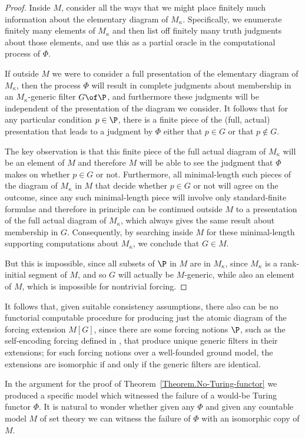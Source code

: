 \documentclass{amsart}
\begin{document}
\begin{proof}
Inside $M$, consider all the ways that we might place finitely much information about the elementary diagram of $M_\kappa$. Specifically, we enumerate finitely many elements of $M_\kappa$ and then list off finitely many truth judgments about those elements, and use this as a partial oracle in the computational process of $\Phi$.

If outside $M$ we were to consider a full presentation of the elementary diagram of $M_\kappa$, then the process $\Phi$ will result in complete judgments about membership in an $M_\kappa$-generic filter $G\of\P$, and furthermore these judgments will be independent of the presentation of the diagram we consider. It follows that for any particular condition $p\in\P$, there is a finite piece of the (full, actual) presentation that leads to a judgment by $\Phi$ either that $p\in G$ or that $p\notin G$.

The key observation is that this finite piece of the full actual diagram of $M_\kappa$ will be an element of $M$ and therefore $M$ will be able to see the judgment that $\Phi$ makes on whether $p\in G$ or not. Furthermore, all minimal-length such pieces of the diagram of $M_\kappa$ in $M$ that decide whether $p\in G$ or not will agree on the outcome, since any such minimal-length piece will involve only standard-finite formulae and therefore in principle can be continued outside $M$ to a presentation of the full actual diagram of $M_\kappa$, which always gives the same result about membership in $G$. Consequently, by searching inside $M$ for these minimal-length supporting computations about $M_\kappa$, we conclude that $G\in M$.

But this is impossible, since all subsets of $\P$ in $M$ are in $M_\kappa$, since $M_\kappa$ is a rank-initial segment of $M$, and so $G$ will actually be $M$-generic, while also an element of $M$, which is impossible for nontrivial forcing.
\end{proof}

It follows that, given suitable consistency assumptions, there also can be no functorial computable procedure for producing just the atomic diagram of the forcing extension $M[G]$, since there are some forcing notions $\P$, such as the self-encoding forcing defined in \cite{FuchsHamkinsReitz2015:Set-theoreticGeology}, that produce unique generic filters in their extensions; for such forcing notions over a well-founded ground model, the extensions are isomorphic if and only if the generic filters are identical.


In the argument for the proof of Theorem~\ref{Theorem.No-Turing-functor} we produced a specific model which witnessed the failure of a would-be Turing functor $\Phi$. It is natural to wonder whether given any $\Phi$ and given any countable model $M$ of set theory we can witness the failure of $\Phi$ with an isomorphic copy of $M$.
\end{document}
